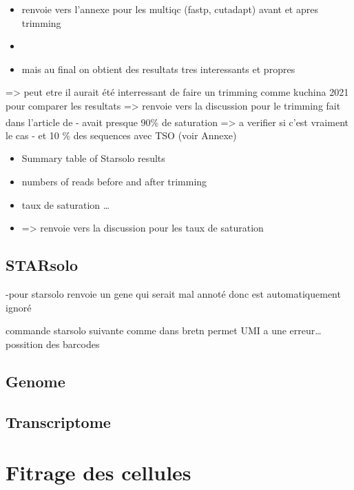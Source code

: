 \documentclass[
  11pt,
  a4paper,
]{report}
\providecommand{\tightlist}{%
  \setlength{\itemsep}{0pt}\setlength{\parskip}{0pt}}\usepackage{longtable,booktabs,array}
\begin{document}
\begin{itemize}
\tightlist
\item
  renvoie vers l'annexe pour les multiqc (fastp, cutadapt) avant et
  apres trimming
\item
\item
  mais au final on obtient des resultats tres interessants et propres
\end{itemize}

=\textgreater{} peut etre il aurait été interressant de faire un
trimming comme kuchina 2021 pour comparer les resultats =\textgreater{}
renvoie vers la discussion pour le trimming fait dans l'article
de\textsuperscript{} - avait presque 90\%
de saturation =\textgreater{} a verifier si c'est vraiment le cas - et
10 \% des sequences avec TSO (voir Annexe)

\begin{itemize}
\tightlist
\item
  Summary table of Starsolo results
\item
  numbers of reads before and after trimming
\item
  taux de saturation \ldots{}
\item
  =\textgreater{} renvoie vers la discussion pour les taux de saturation
\end{itemize}

\section{STARsolo}\label{starsolo}

-pour starsolo renvoie un gene qui serait mal annoté donc est
automatiquement ignoré

commande starsolo suivante comme dans bretn permet UMI a une
erreur\ldots{} possition des barcodes

\section{Genome}\label{genome}

\section{Transcriptome}\label{transcriptome}


\chapter{Fitrage des cellules}\label{fitrage-des-cellules}
\end{document}
